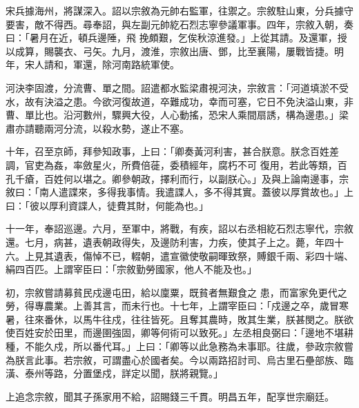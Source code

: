\begin{pinyinscope}
 宋兵據海州，將謀深入。詔以宗敘為元帥右監軍，往禦之。宗敘駐山東，分兵據守要害，敵不得西。尋奉詔，與左副元帥紇石烈志寧參議軍事。四年，宗敘入朝，奏曰：「暑月在近，頓兵邊陲，飛
 挽頗艱，乞俟秋涼進發。」上從其請。及還軍，授以成算，賜襲衣、弓矢。九月，渡淮，宗敘出唐、鄧，比至襄陽，屢戰皆捷。明年，宋人請和，軍還，除河南路統軍使。



 河決李固渡，分流曹、單之間。詔遣都水監梁肅視河決，宗敘言：「河道填淤不受水，故有決溢之患。今欲河復故道，卒難成功，幸而可塞，它日不免決溢山東，非曹、單比也。沿河數州，驟興大役，人心動搖，恐宋人乘間扇誘，構為邊患。」梁肅亦請聽兩河分流，以殺水勢，遂止不塞。



 十年，召至京師，拜參知政事，上曰：「卿奏黃河利害，甚合朕意。朕念百姓差調，官吏為姦，率斂星火，所費倍蓰，委積經年，腐朽不可
 復用，若此等類，百孔千瘡，百姓何以堪之。卿參朝政，擇利而行，以副朕心。」及與上論南邊事，宗敘曰：「南人遣諜來，多得我事情。我遣諜人，多不得其實。蓋彼以厚賞故也。」上曰：「彼以厚利資諜人，徒費其財，何能為也。」



 十一年，奉詔巡邊。六月，至軍中，將戰，有疾，詔以右丞相紇石烈志寧代，宗敘還。七月，病甚，遺表朝政得失，及邊防利害，力疾，使其子上之。薨，年四十六。上見其遺表，傷悼不已，輟朝，遣宣徽使敬嗣暉致祭，賻銀千兩、彩四十端、絹四百匹。上謂宰臣曰：「宗敘勤勞國家，他人不能及也。」



 初，宗敘嘗請募貧民戍邊屯田，給以廩粟，既貧者無艱食之
 患，而富家免更代之勞，得專農業。上善其言，而未行也。十七年，上謂宰臣曰：「戍邊之卒，歲冒寒暑，往來番休，以馬牛往戍，往往皆死。且奪其農時，敗其生業，朕甚閔之。朕欲使百姓安於田里，而邊圉強固，卿等何術可以致死。」左丞相良弼曰：「邊地不堪耕種，不能久戍，所以番代耳。」上曰：「卿等以此急務為未事耶。往歲，參政宗敘嘗為朕言此事。若宗敘，可謂盡心於國者矣。今以兩路招討司、烏古里石壘部族、臨潢、泰州等路，分置堡戍，詳定以聞，朕將親覽。」



 上追念宗敘，聞其子孫家用不給，詔賜錢三千貫。明昌五年，配享世宗廟廷。



\end{pinyinscope}